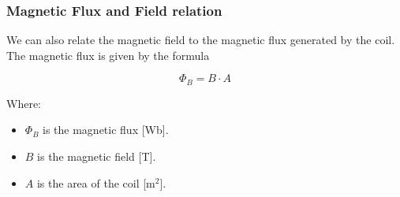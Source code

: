 \begin{samepage}
  \subsubsection{Magnetic Flux and Field relation}
  \nopagebreak

  We can also relate the magnetic field to the magnetic flux generated by the coil. The magnetic flux is given by the formula
  \nopagebreak

  \begin{equation}
    \Phi_B=B \cdot A \label{eq: Magnetic_flux_&_field}
  \end{equation}
  \nopagebreak

  Where:
  \begin{itemize}
    \item \( \Phi_B \) is the magnetic flux [Wb].
    \item \( B \) is the magnetic field [T].
    \item \( A \) is the area of the coil [m\(^2\)].
  \end{itemize}
\end{samepage}